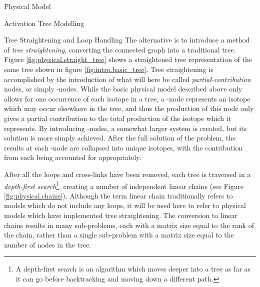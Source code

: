 \begin{chapter}{Physical Model\label{chap:physical}}
\begin{section}{Activation Tree Modelling\label{sec:physical.chains}}
\begin{subsection}{Tree Straightening and Loop Handling}
    The alternative is to introduce a method of \textsl{tree
      straightening}, converting the connected graph into a
    traditional \nary tree.  Figure \ref{fig:physical.straight_tree}
    shows a straightened tree representation of the same tree shown in
    figure \ref{fig:intro.basic_tree}.  Tree straightening is
    accomplished by the introduction of what will here be called
    \textsl{partial-contribution} nodes, or simply \pc-nodes.  While
    the basic physical model described above only allows for one
    occurrence of each isotope in a tree, a \pc-node represents an
    isotope which may occur elsewhere in the tree, and thus the
    production of this node only gives a partial contribution to the
    total production of the isotope which it represents.  By
    introducing \pc-nodes, a somewhat larger system is created, but
    its solution is more simply achieved.  After the full solution of
    the problem, the results at each \pc-node are collapsed into
    unique isotopes, with the contribution from each being accounted
    for appropriately.

    After all the loops and cross-links have been removed, each tree
    is traversed in a \textsl{depth-first search}\footnote{A
      depth-first search is an algorithm which moves deeper into a
      tree as far as it can go before backtracking and moving down a
      different path.}, creating a number of independent linear chains
    (see Figure \ref{fig:physical.chains}).  Although the term linear
    chain traditionally refers to models which do not include any
    loops, it will be used here to refer to physical models which have
    implemented tree straightening.  The conversion to linear chains
    results in many sub-problems, each with a matrix size equal to the
    rank of the chain, rather than a single sub-problem with a matrix
    size equal to the number of nodes in the tree.
    
    \begin{floatingfigure}{0.55\columnwidth}
      \begin{center}
        \caption{Separated linear chain representation of activation tree.}\label{fig:physical.chains}
      \end{center}
    \end{floatingfigure}


\end{subsection}
\end{section}
\end{chapter}
